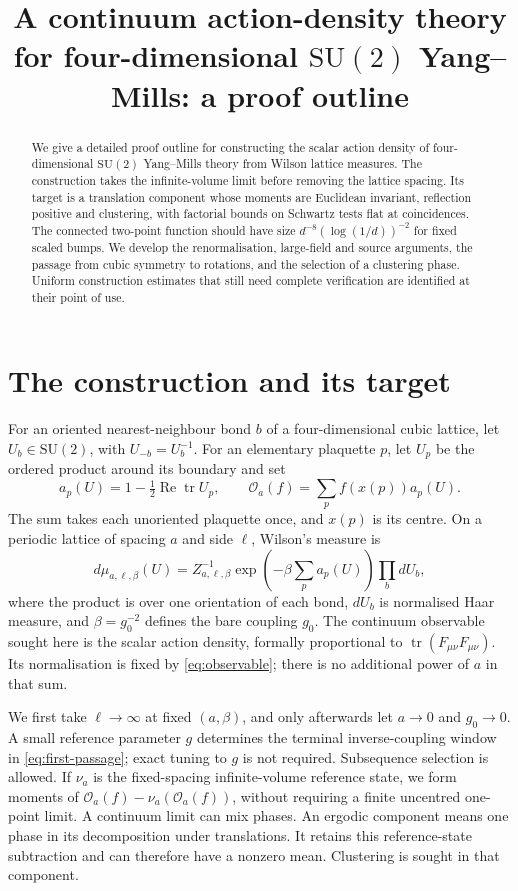 \documentclass[11pt,letterpaper,reqno]{amsart}
\title[Four-dimensional Yang--Mills: a proof outline]{A continuum action-density theory for four-dimensional
\texorpdfstring{$\mathrm{SU}(2)$}{SU(2)} Yang--Mills: a proof outline}
\date{}
\theoremstyle{definition}
\theoremstyle{remark}
\newcommand{\SU}{\mathrm{SU}}
\newcommand{\cO}{\mathcal O}
\newcommand{\tr}{\operatorname{tr}}
\begin{document}
\begin{abstract}
We give a detailed proof outline for constructing the scalar action
density of four-dimensional $\SU(2)$ Yang--Mills theory from Wilson
lattice measures. The construction takes the infinite-volume limit
before removing the lattice spacing. Its target is a translation
component whose moments are Euclidean invariant, reflection positive
and clustering, with factorial bounds on Schwartz tests flat at
coincidences. The connected two-point function should have size
$d^{-8}(\log(1/d))^{-2}$ for fixed scaled bumps. We develop the
renormalisation, large-field and source arguments, the passage from
cubic symmetry to rotations, and the selection of a clustering phase.
Uniform construction estimates that still need complete verification
are identified at their point of use.
\end{abstract}
\maketitle
\tableofcontents

\section{The construction and its target}\label{sec:main}

For an oriented nearest-neighbour bond $b$ of a four-dimensional cubic
lattice, let $U_b\in\SU(2)$, with $U_{-b}=U_b^{-1}$. For an elementary
plaquette $p$, let $U_p$ be the ordered product around its boundary and set
\begin{equation}\label{eq:observable}
 a_p(U)=1-\tfrac12\operatorname{Re}\tr U_p,
 \qquad \cO_a(f)=\sum_p f(x(p))a_p(U).
\end{equation}
The sum takes each unoriented plaquette once, and $x(p)$ is its centre.
On a periodic lattice of spacing $a$ and side $\ell$, Wilson's measure is
\begin{equation}\label{eq:wilson}
 d\mu_{a,\ell,\beta}(U)
 =Z_{a,\ell,\beta}^{-1}
   \exp\!\left(-\beta\sum_p a_p(U)\right)\prod_b dU_b,
\end{equation}
where the product is over one orientation of each bond, $dU_b$ is
normalised Haar measure, and $\beta=g_0^{-2}$ defines the bare coupling
$g_0$. The continuum observable sought here is the
scalar action density, formally proportional to
$\tr(F_{\mu\nu}F_{\mu\nu})$. Its normalisation is fixed by
\eqref{eq:observable}; there is no additional power of $a$ in that sum.

We first take $\ell\to\infty$ at fixed $(a,\beta)$, and only afterwards
let $a\to0$ and $g_0\to0$. A small reference parameter $g$ determines
the terminal inverse-coupling window in \eqref{eq:first-passage}; exact
tuning to $g$ is not required. Subsequence selection is allowed. If
$\nu_a$ is the fixed-spacing infinite-volume reference state, we form
moments of $\cO_a(f)-\nu_a(\cO_a(f))$, without requiring a finite
uncentred one-point limit. A continuum limit can mix phases. An ergodic
component means one phase in its decomposition under translations.
It retains this reference-state subtraction and can therefore have a
nonzero mean. Clustering is sought in that component.
\end{document}
